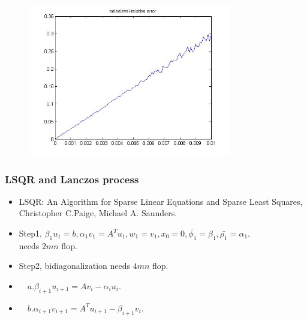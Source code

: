 \documentclass{beamer}
\begin{document}
\begin{frame}
\begin{figure}[htbp]
\begin{minipage}[b]{0.8\linewidth}
\includegraphics[width=3.5in]{Images/noiselevel_relativeerror}
\end{minipage}
\end{figure}

\end{frame}


\begin{frame}
\frametitle{LSQR and Lanczos process}
\begin{itemize}
    \item LSQR: An Algorithm for Sparse Linear Equations and Sparse Least Squares, Christopher C.Paige, Michael A. Saunders.
    \item Step1, $\beta_{1}u_{1}=b, \alpha_{1}v_{1}=A^{T}u_{1}, w_{1}=v_{1}, x_{0}=0, \bar{\phi_{1}}=\beta_{1},\bar{\rho_{1}}=\alpha_{1}$.\\
                 needs $2mn$ flop.
    \item Step2, bidiagonalization needs $4mn$ flop.
    \item       $\quad a.\beta_{i+1}u_{i+1}=Av_{i}-\alpha_{i}u_{i}$.
    \item       $\quad b.\alpha_{i+1}v_{i+1}=A^{T}u_{i+1}-\beta_{i+1}v_{i}$.
\end{itemize}
\end{frame}
\end{document}
